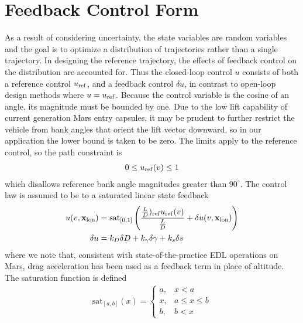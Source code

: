 \section{Feedback Control Form}
As a result of considering uncertainty, the state variables are random variables and the goal is to optimize a distribution of trajectories rather than a single trajectory.
In designing the reference trajectory, the effects of feedback control on the distribution are accounted for. Thus the closed-loop control $u$ consists of both a reference control $u_{\mathrm{ref}}$, and a feedback control $\delta u$, in contrast to open-loop design methods where $u=u_{\mathrm{ref}}$. Because the control variable is the cosine of an angle, its magnitude must be bounded by one. 
Due to the low lift capability of current generation Mars entry capsules, it may be prudent to further restrict the vehicle from bank angles that orient the lift vector downward, so in our application the lower bound is taken to be zero. The limits apply to the reference control, so the path constraint is
\begin{align}
	0 \le u_{\mathrm{ref}}(v) \le 1 \label{Eq:Control_bounds}
\end{align}
which disallows reference bank angle magnitudes greater than $90^\circ$.
The control law is assumed to be to a saturated linear state feedback 
\begin{align}
	u(v,\mathbf{x}_{\mathrm{lon}}) &= \mathrm{sat}_{[0,1]}\left(\frac{\frac{L}{D})_{\mathrm{ref}}u_{\mathrm{ref}}(v)}{\frac{L}{D}} + \delta u(v,\mathbf{x}_{\mathrm{lon}})\right) \label{Eq:Control}\\
	\delta u &= k_D\delta D + k_{\gamma}\delta\gamma + k_s\delta s \label{Eq:Feedback}
\end{align}
where we note that, consistent with state-of-the-practice EDL operations on Mars, drag acceleration has been used as a feedback term in place of altitude. 
The saturation function is defined
\begin{align*}
	\mathrm{sat}_{[a,b]}(x) = \left\{\begin{array}{lc}
		a, &  x < a\\
		x, &  a\le x \le b\\
		b, &  b < x
	\end{array} \right. %
\end{align*}
